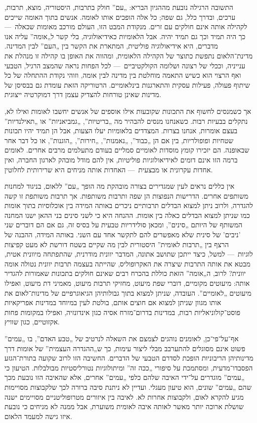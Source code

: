 התשובה הרגילה נובעת מההגיון הבריא: „עם” חולק בתרבות, היסטוריה, מוצא, תרבות, ערכים, ובדרך כלל, גם שפה; כל אלה הופכים אותו לאומה. אנשים בתוך האומה שייכים לקהילה אותה אינם חולקים עם זרים. מנקודת המבט הזו, העולם מורכב מאומות שכאלה~— כך היה תמיד וכך גם תמיד יהיה. אבל הלאומיות כאידיאולוגיה, בלי קשר ל„אומה” עליה אנו מדברים, היא אידיאולוגיה פוליטית, המתארת את הקשר בין „העם” לבין המדינה. מדינת־הלאום נתפשת כתוצר של הקהילה הלאומית, ומהווה את האופן בו קהילה זו מנהלת את ענייניה, וככלי של רצונה ושלומה הקולקטיביים~— לכל הפחות נראה שהמצב הרגיל, הטבעי ואף הרצוי הוא כשיש התאמה מוחלטת בין מדינה לבין אומה, וזוהי נקודת ההתחלה של כל שיתוף פעולה, פעילות עסקית והתארגנות בינלאומיים. הרטוריקה הזאת עומדת גם בבסיסן של מדינות שאינן טורחות להצדיק עצמן דרך דמוקרטיה ייצוגית.

אך כשמנסים לחשוף את התכונות שקובעות אילו אוספים של אנשים יחשבו לאומות ואילו לא, נתקלים בבעיות רבות. כשאנחנו מנסים להבהיר מה „בריטיות”, „גמביאניות” או „תאילנדיות” בעצם אומרות, אנחנו בצרות. המצדדים בלאומיות יעלו הצעות, אבל הן תמיד יהיו תכונות שטחיות ופופולריות, בין אם הן „כבוד”, „נאמנות”, „חירות”, „הוגנות”, או כל דבר אחר שבאופנה. הם יזכירו קומץ מוסדות לאומיים סמליים בעודם מתעלמים מרבים אחרים. לאומים ברמה הזו אינם דומים לאידיאולוגיות פוליטיות, אין להם מודל מובהק לארגון החברה, ואין אחדות עקרונית או מבצעית~— האחדות אותה מניחים היא שרירותית לחלוטין.

אין כללים נראים לעין  שמגדירים בצורה מובהקת מה הופך „עם” ללאום, בניגוד למחנות משותפים אחרים. הדרישות הנפוצות הן שפה ותרבות משותפות. אך תרבות משותפת זו קשה להגדרה, ולרוב ניתן למצוא הבדלים תרבותיים ניכרים באותה המידה בין אוכלוסיות בתוך אומות כמו שניתן למצוא הבדלים כאלה בין אומות. ההנחה היא כי לשני סינים בני ההאן ישנו המחנה המשותף של היותם „סינים”, ומכאן סולידריות טבעית על בסיס זה, גם אם הם דוברים שני 'ניבים' של סינית שלא מאפשרים להם לתקשר אחד עם השני. באותה המידה, ההבנה של הרצף בין „תרבות לאומית” היסטורית לבין מה  שקיים בשטח דורשת לא מעט קפיצות לוגיות~— למשל, כיצד ייתכן שתושב אתונה, המדבר יוונית מודרנית, שהתפתחה מיוונית אטית, מבטא את אותה התרבות שיצרה את האקרופוליס, שהייתה בעצמה תרבות יוונית נטולה אומה יוונית? לרוב, ה„אומה” הזאת כוללת בהכרח רבים שאינם חולקים בתכונות שאמורות להגדיר אותה: מיעוטים מקומיים, דוברי שפת מיעוט, מחזיקי תרבות מיעוט, מאמיני דת מיעוט, ואפילו מיעוטים „לאומיים”. העובדה, שניתן למצוא בתוך גבולותיהן הגיאוגרפיים של מדינות־לאום את אותו מגוון שניתן למצוא אם חוצים אותם, בולטת לעין במיוחד במדינות אפריקאיות פוסט־קולוניאליות רבות, במדינות בדרום־מזרח אסיה כגון אינדונזיה, ואפילו במקומות פחות אקזוטיים, כגון שוויץ.

אף־על־פי־כן, לאומנים נוהגים לצמצם את השאלה לנרטיב של „טבע האדם”, בו „עמים” פשוט אינם מסוגלים להתערבב מבלי ליצור עימות, כך ש„ההגדרה העצמית” של אומות דרך מדינותיהן הריבוניות הופכת לסדרם הטבעי של הדברים. החשיבה הזו לרוב שקועה בתורת־הגזע הפסבדו־מדעית, ומסתמכת על סיפורי „ככה זה” ומיתולוגיות נטורליסטיות מבולבלות. הטיעון כי „עמים” מוגדרים על־ידי האיבה שלהם כלפי „עמים” אחרים, אלא שהאיבה הזו נובעת מכך שהם „עמים” שונים, הוא טיעון מעגלי. ועדיין לא ניתנת סיבה ברורה לכך שלקבוצות מסויימות מגיע להקרא לאום, ולקבוצות אחרות לא. לאיבה בין איזורים מטרופוליטניים מסויימים ישנה שושלת ארוכה יותר מאשר לאותה איבה לאומית משוערת, אבל ממנה לא מניחים כי נובעת איזו גישה למעמד הלאום.

